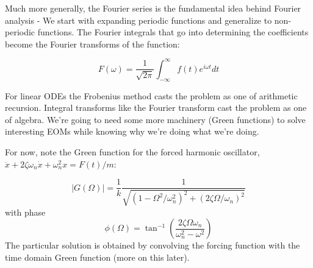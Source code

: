 \documentclass{article}
\theoremstyle{definition}
\theoremstyle{remark}
\theoremstyle{remark}
\begin{document}
Much more generally, the Fourier series is the fundamental idea behind Fourier analysis - We start with expanding periodic functions and generalize to non-periodic functions. The Fourier integrals that go into determining the coefficients become the Fourier transforms of the function:

$$
F(\omega) = \frac{1}{\sqrt{2\pi}}\int_{-\infty}^\infty f(t)e^{i\omega t}dt
$$   

For linear ODEs the Frobenius method casts the problem as one of arithmetic recursion. Integral transforms like the Fourier transform cast the problem as one of algebra. We're going to need some more machinery (Green functions) to solve interesting EOMs while knowing why we're doing what we're doing. 

For now, note the Green function for the forced harmonic oscillator, $\ddot x+2\zeta \omega_n\dot x+\omega_n^2x=F(t)/m$:
\begin{tcolorbox}[colframe=red, colback=yellow!30]
	$$
|G(\Omega)| = \frac{1}{k}\frac{1}{\sqrt{\left(1-\Omega^2/\omega_n^2\right)^2+\left(2\zeta\Omega/\omega_n\right)^2}}
$$
with phase
$$
\phi(\Omega) = \tan^{-1}\left(\frac{2\zeta \Omega\omega_n}{\omega_n^2-\omega^2}\right) 
$$
The particular solution is obtained by convolving the forcing function with the time domain Green function (more on this later).
\end{tcolorbox}
\end{document}
